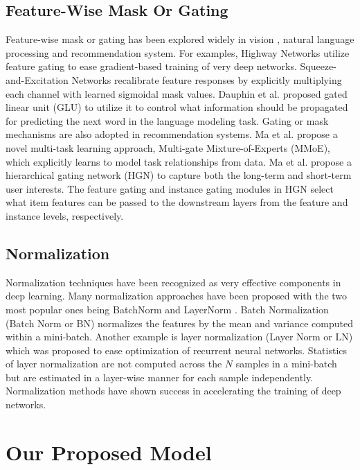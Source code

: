 \documentclass[sigconf]{acmart}
\begin{document}
\subsection{Feature-Wise Mask Or Gating}
Feature-wise mask or gating  has been explored widely in vision \cite{hu2018squeeze,srivastava2015highway}, natural language processing \cite{dauphin2017language} and recommendation system\cite{ma2018modeling,ma2019hierarchical}. For examples, Highway Networks \cite{srivastava2015highway} utilize feature gating to ease gradient-based training of very deep networks. Squeeze-and-Excitation Networks\cite{hu2018squeeze} recalibrate feature responses by explicitly multiplying each channel with learned sigmoidal mask values. Dauphin et al.\cite{dauphin2017language} proposed gated linear unit (GLU) to utilize it to control what information should be propagated for predicting the next word in the language modeling task. Gating or mask mechanisms are also adopted in  recommendation systems. Ma et al. \cite{ma2018modeling} propose a novel multi-task learning approach, Multi-gate Mixture-of-Experts (MMoE), which explicitly learns to model task relationships from data. Ma et al.\cite{ma2019hierarchical} propose a hierarchical gating network (HGN) to capture both the long-term and short-term user interests. The feature gating and instance gating modules in HGN  select what item features can be passed to the downstream layers from the feature and instance levels, respectively.


\subsection{Normalization}
Normalization techniques have been recognized as very effective components in deep learning. Many normalization approaches have been proposed with the two most popular ones being BatchNorm \cite{ioffe2015batch} and LayerNorm \cite{ba2016layer} . Batch Normalization (Batch Norm or BN)\cite{ioffe2015batch} normalizes the features by the mean and variance computed within a mini-batch. Another example is layer normalization (Layer Norm or LN)\cite{ba2016layer} which was proposed to ease optimization of recurrent neural networks. Statistics of layer normalization are not computed across the $N$ samples in a mini-batch but are estimated in a layer-wise manner for each sample independently. Normalization methods have shown success in accelerating the training of deep networks.


\section{Our Proposed Model}
\end{document}
